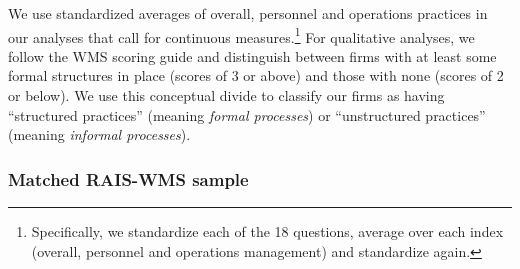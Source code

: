 We use standardized averages of overall, personnel and operations practices in our analyses that call for continuous measures.\footnote{Specifically, we standardize each of the 18 questions, average over each index (overall, personnel and operations management) and standardize again.} For qualitative analyses, we follow the WMS scoring guide and distinguish between firms with at least some formal structures in place (scores of 3 or above) and those with none (scores of 2 or below). We use this conceptual divide to classify our firms as having ``structured practices'' (meaning \textit{formal processes}) or ``unstructured practices'' (meaning \textit{informal processes}). 


\subsubsection{Matched RAIS-WMS sample}

